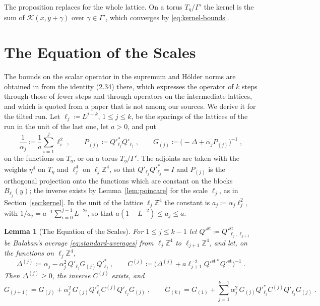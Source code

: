 \documentclass[11pt]{preprint}
\numberwithin{equation}{section}
\newtheorem{lemma}[theorem]{Lemma}
\theoremstyle{definition}
\theoremstyle{remark}
\theoremstyle{plain}
\begin{document}
The proposition replaces \cite[(2.35), (2.36)]{BalabanRDG} for the whole lattice. On a torus $T_\eta/\Gamma'$ the kernel is the sum of $\mathcal K(x, y + \gamma)$ over $\gamma \in \Gamma'$, which converges by \eqref{eq:kernel-bounds}.

\section{The Equation of the Scales}\label{sec:scales}

The bounds on the scalar operator in the supremum and H\"older norms are obtained in \cite{BalabanRDG} from the identity (2.34) there, which expresses the operator of $k$ steps through those of fewer steps and through operators on the intermediate lattices, and which is quoted from a paper that is not among our sources. We derive it for the tilted run. Let $\ell_j \coloneqq L^{j-k}$, $1 \leq j \leq k$, be the spacings of the lattices of the run in the unit of the last one, let $a > 0$, and put
\begin{equation}\label{eq:alpha-scales}
    \frac{1}{\alpha_j} \coloneqq \frac1a\sum_{i=1}^{j}\ell_i^2\;,
    \qquad
    P_{(j)} \coloneqq Q'^*_{\ell_j}Q'_{\ell_j}\;,
    \qquad
    G_{(j)} \coloneqq \bigl(-\Delta + \alpha_jP_{(j)}\bigr)^{-1}\;,
\end{equation}
on the functions on $T_\eta$, or on a torus $T_\eta/\Gamma'$. The adjoints are taken with the weights $\eta^4$ on $T_\eta$ and $\ell_j^4$ on $\ell_j\mathbb Z^4$, so that $Q'_{\ell_j}Q'^*_{\ell_j} = I$ and $P_{(j)}$ is the orthogonal projection onto the functions which are constant on the blocks $B_{\ell_j}(y)$; the inverse exists by Lemma~\ref{lem:poincare} for the scale $\ell_j$, as in Section~\ref{sec:kernel}. In the unit of the lattice $\ell_j\mathbb Z^4$ the constant is $a_j \coloneqq \alpha_j\ell_j^2$, with $1/a_j = a^{-1}\sum_{i=0}^{j-1}L^{-2i}$, so that $a(1 - L^{-2}) \leq a_j \leq a$.

\begin{lemma}[The Equation of the Scales]\label{lem:scales}
For $1 \leq j \leq k - 1$ let $Q'^{\mathrm{st}} \coloneqq Q'^{\mathrm{st}}_{\ell_j,\ell_{j+1}}$ be Ba{\l}aban's average \eqref{eq:standard-averages} from $\ell_j\mathbb Z^4$ to $\ell_{j+1}\mathbb Z^4$, and let, on the functions on $\ell_j\mathbb Z^4$,
\begin{equation}\label{eq:unit-operators}
    \Delta^{(j)} \coloneqq \alpha_j - \alpha_j^2\,Q'_{\ell_j}G_{(j)}Q'^*_{\ell_j}\;,
    \qquad
    C^{(j)} \coloneqq \bigl(\Delta^{(j)} + a\ell_{j+1}^{-2}Q'^{\mathrm{st}*}Q'^{\mathrm{st}}\bigr)^{-1}\;.
\end{equation}
Then $\Delta^{(j)} \geq 0$, the inverse $C^{(j)}$ exists, and
\begin{equation}\label{eq:scales}
    G_{(j+1)} = G_{(j)} + \alpha_j^2\,G_{(j)}Q'^*_{\ell_j}C^{(j)}Q'_{\ell_j}G_{(j)}\;,
    \qquad
    G_{(k)} = G_{(1)} + \sum_{j=1}^{k-1}\alpha_j^2\,G_{(j)}Q'^*_{\ell_j}C^{(j)}Q'_{\ell_j}G_{(j)}\;.
\end{equation}
\end{lemma}
\end{document}
